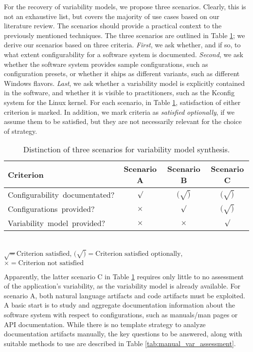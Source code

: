 For the recovery of variability models, we propose three scenarios. Clearly,
this is not an exhaustive list, but covers the majority of use cases based on
our literature review. The scenarios should provide a practical context to the
previously mentioned techniques. The three scenarios are outlined in Table
\ref{tab:synthesis}; we derive our scenarios based on three criteria.
\emph{First}, we ask whether, and if so, to what extent configurability for a
software system is documented. \emph{Second}, we ask whether the software
system provides sample configurations, such as configuration presets, or
whether it ships as different variants, such as different Windows flavors.
\emph{Last}, we ask whether a variability model is explicitly contained in the
software, and whether it is visible to practitioners, such as the Kconfig
system for the Linux kernel. For each scenario, in Table \ref{tab:synthesis},
satisfaction of either criterion is marked. In addition, we mark criteria as
\emph{satisfied optionally}, if we assume them to be satisfied, but they are
not necessarily relevant for the choice of strategy.

\begin{table} 
	\centering
	\begin{tabular}{lccc}%
	\toprule
	\textbf{Criterion} & \textbf{Scenario A} & \textbf{Scenario B} &
	\textbf{Scenario C}
	\\
	\midrule
	\mbox{Configurability documentated?} & $\surd$ & $(\surd)$ & $(\surd)$ \\
	\mbox{Configurations provided?} & $\times$ & $\surd$ & $(\surd)$ \\
	\mbox{Variability model provided?} & $\times$ & $\times$ & $\surd$ \\
	\bottomrule
	\end{tabular}\\
	\vspace{1mm}
	{\footnotesize $\surd = \text{Criterion satisfied}$, $(\surd) =
	\text{Criterion satisfied optionally}$, $\times = \text{Criterion not
	satisfied}$}
	\caption{Distinction of three scenarios for variability model synthesis. }
	\label{tab:synthesis}
\end{table}

Apparently, the latter scenario C in Table \ref{tab:synthesis} requires only
little to no assessment of the application's variability, as the variability
model is already available.
For scenario A, both natural language artifacts and code artifacts must be
exploited. A basic start is to study and aggregate documentation information
about the software system with respect to configurations, such as manuals/man
pages or API documentation. While there is no template strategy to analyze
documentation artifacts manually, the key questions to be answered, along with
suitable methods to use are described in Table \ref{tab:manual_var_assessment}.

